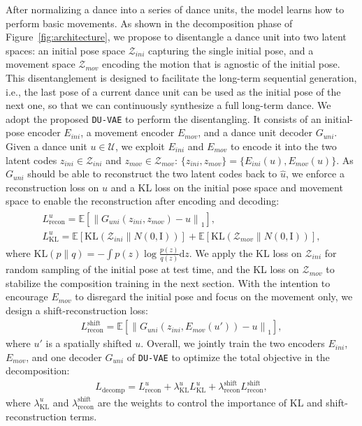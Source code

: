 \documentclass{article}
\begin{document}
After normalizing a dance into a series of dance units, the model learns how to perform basic movements.
As shown in the decomposition phase of Figure~\ref{fig:architecture}, we propose to disentangle a dance unit into two latent spaces: an initial pose space $\mathcal{Z}_{ini}$ capturing the single initial pose, and a movement space $\mathcal{Z}_{mov}$ encoding the motion that is agnostic of the initial pose.
This disentanglement is designed to facilitate the long-term sequential generation, i.e., the last pose of a current dance unit can be used as the initial pose of the next one, so that we can continuously synthesize a full long-term dance.   
We adopt the proposed \texttt{DU-VAE} to perform the disentangling.
It consists of an initial-pose encoder $E_{ini}$, a movement encoder $E_{mov}$, and a dance unit decoder $G_{uni}$.   
Given a dance unit $u \in\mathcal{U}$, we exploit $E_{ini}$ and $E_{mov}$ to encode it into the two latent codes $z_{ini}\in\mathcal{Z}_{ini}$ and $z_{mov}\in\mathcal{Z}_{mov}$: $\{z_{ini}, z_{mov}\} = \{E_{ini}(u), E_{mov}(u)\}$.
As $G_{uni}$ should be able to reconstruct the two latent codes back to $\hat{u}$, 
we enforce a reconstruction loss on $u$ and a KL loss on the initial pose space and movement space to enable the reconstruction after encoding and decoding:
\begin{align}
\begin{gathered}
L^{u}_\mathrm{recon} = \mathbb{E}[\left\lVert{G_{uni}(z_{ini}, z_{mov}) - u}\right\rVert_{1}],\\
L^{u}_{\mathrm{KL}} = \mathbb{E}[\mathrm{KL}(\mathcal{Z}_{ini}\|N(0,\mathrm{I}))]+\mathbb{E}[\mathrm{KL}(\mathcal{Z}_{mov}\|N(0,\mathrm{I}))],
\end{gathered}
\end{align}
where $\mathrm{KL}(p\|q)=-\int{p(z)\log{\frac{p(z)}{q(z)}}\mathrm{d}z}$. 
We apply the KL loss on $\mathcal{Z}_{ini}$ for random sampling of the initial pose at test time, and the KL loss on $\mathcal{Z}_{mov}$ to stabilize the composition training in the next section. With the intention to encourage $E_{mov}$ to disregard the initial pose and focus on the movement only, we design a shift-reconstruction loss:
\begin{align}
L^{\mathrm{shift}}_{\mathrm{recon}} = \mathbb{E}[\left\lVert{G_{uni}(z_{ini}, E_{mov}(u')) - u}\right\rVert_{1}],
\end{align}
where $u'$ is a spatially shifted $u$. 
Overall, we jointly train the two encoders $E_{ini}$, $E_{mov}$, and one decoder $G_{uni}$ of \texttt{DU-VAE} to optimize the total objective in the decomposition:
\begin{align}
L_{\mathrm{decomp}} = L^{u}_{\mathrm{recon}} + \lambda^{u}_{\mathrm{KL}}L^{u}_{\mathrm{KL}} + \lambda^{\mathrm{shift}}_{\mathrm{recon}}L^{\mathrm{shift}}_{\mathrm{recon}},
\end{align}
\noindent where $\lambda^{u}_{\mathrm{KL}}$ and $\lambda^{\mathrm{shift}}_{\mathrm{recon}}$ are the weights to control the importance of KL and shift-reconstruction terms. 
\end{document}

